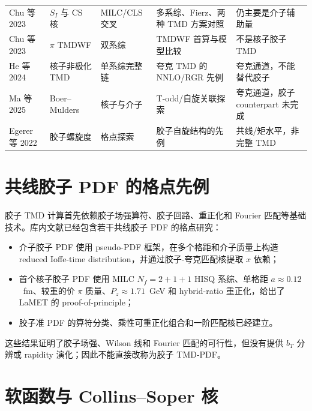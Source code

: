 \documentclass[UTF8,12pt,a4paper,twoside,openany]{ctexbook}
\begin{document}
\begin{footnotesize}
\begin{longtable}{L{2.6cm}L{2.0cm}L{2.7cm}L{2.6cm}L{2.7cm}}
Chu 等 2023\cite{ChuSoft2023} & \(S_I\) 与 CS 核 & MILC/CLS 交叉 & 多系综、Fierz、两种 TMD 方案对照 & 仍主要是介子辅助量 \\
Chu 等 2023\cite{ChuTMDWF2023} & \(\pi\) TMDWF & 双系综 & TMDWF 首算与模型比较 & 不是核子胶子 TMD \\
He 等 2024\cite{HeTMD2024} & 核子非极化 TMD & 单系综完整链 & 夸克 TMD 的 NNLO/RGR 先例 & 夸克通道，不能替代胶子 \\
Ma 等 2025\cite{MaBM2025} & Boer--Mulders & 核子与介子 & T-odd/自旋关联探索 & 夸克通道，胶子 counterpart 未完成 \\
Egerer 等 2022\cite{Egerer2022} & 胶子螺旋度 & 格点探索 & 胶子自旋结构的先例 & 共线/矩水平，非完整 TMD \\
\bottomrule
\end{longtable}
\end{footnotesize}

\section{共线胶子 PDF 的格点先例}

胶子 TMD 计算首先依赖胶子场强算符、胶子回路、重正化和 Fourier 匹配等基础技术。库内文献已经包含若干共线胶子 PDF 的格点研究：
\begin{itemize}
  \item 介子胶子 PDF 使用 pseudo-PDF 框架，在多个格距和介子质量上构造 reduced Ioffe-time distribution，并通过胶子-夸克匹配核提取 \(x\) 依赖\cite{FanLinPion2021}；
  \item 首个核子胶子 PDF 使用 MILC \(N_f=2+1+1\) HISQ 系综、单格距 \(a\approx0.12\)~fm、较重的价 \(\pi\) 质量、\(P_z\approx1.71\)~GeV 和 hybrid-ratio 重正化，给出了 LaMET 的 proof-of-principle\cite{GoodYaoLin2026}；
  \item 胶子准 PDF 的算符分类、乘性可重正化组合和一阶匹配核已经建立\cite{ZhangGluonLaMET2019,LiMaQiu2019,Balitsky2020}。
\end{itemize}
这些结果证明了胶子场强、Wilson 线和 Fourier 匹配的可行性，但没有提供 \(b_T\) 分辨或 rapidity 演化；因此不能直接改称为胶子 TMD-PDF。

\section{软函数与 Collins--Soper 核}
\end{document}
